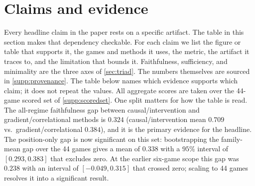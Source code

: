 \section{Claims and evidence}\label{supp:claims}

Every headline claim in the paper rests on a specific artifact. The table in this section
makes that dependency checkable. For each claim we list the figure or table that supports it,
the games and methods it uses, the metric, the artifact it traces to, and the limitation that
bounds it. Faithfulness, sufficiency, and minimality are the three axes of \Sectionname\ref{sec:triad}.
The numbers themselves are sourced in \Sectionname\ref{supp:provenance}. The table below names which
evidence supports which claim; it does not repeat the values. All aggregate scores are taken
over the 44-game scored set of \Sectionname\ref{supp:scoredset}. One split matters for how the
table is read. The all-regime faithfulness gap between causal/intervention and
gradient/correlational methods is $0.324$ (causal/intervention mean $0.709$ vs.\ gradient/correlational
$0.384$), and it is the primary evidence for the headline. The position-only gap is now
significant on this set: bootstrapping the family-mean gap over the 44 games gives a mean of
$0.338$ with a $95\%$ interval of $[0.293,0.383]$ that excludes zero. At the earlier six-game
scope this gap was $0.238$ with an interval of $[-0.049,0.315]$ that crossed zero; scaling to
44 games resolves it into a significant result.


